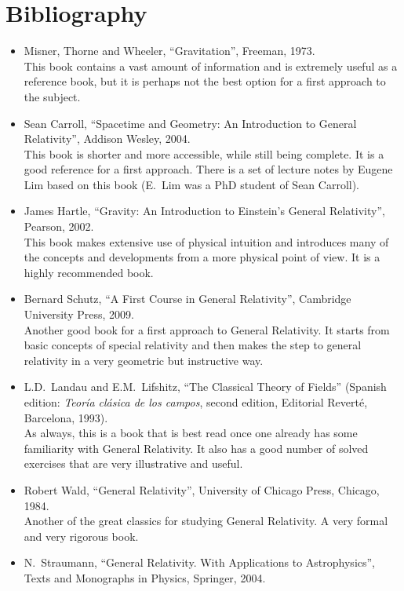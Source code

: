 \section*{Bibliography}
\begin{itemize}[label={},leftmargin=0pt,itemsep=0.6em]
\item Misner, Thorne and Wheeler, ``Gravitation'', Freeman, 1973.\\
This book contains a vast amount of information and is extremely useful as a reference book, but it is perhaps not the best option for a first approach to the subject.
\item Sean Carroll, ``Spacetime and Geometry: An Introduction to General Relativity'', Addison Wesley, 2004.\\
This book is shorter and more accessible, while still being complete. It is a good reference for a first approach. There is a set of lecture notes by Eugene Lim based on this book (E.~Lim was a PhD student of Sean Carroll).
\item James Hartle, ``Gravity: An Introduction to Einstein's General Relativity'', Pearson, 2002.\\
This book makes extensive use of physical intuition and introduces many of the concepts and developments from a more physical point of view. It is a highly recommended book.
\item Bernard Schutz, ``A First Course in General Relativity'', Cambridge University Press, 2009.\\
Another good book for a first approach to General Relativity. It starts from basic concepts of special relativity and then makes the step to general relativity in a very geometric but instructive way.
\item L.D.~Landau and E.M.~Lifshitz, ``The Classical Theory of Fields'' (Spanish edition: \emph{Teoría clásica de los campos}, second edition, Editorial Reverté, Barcelona, 1993).\\
As always, this is a book that is best read once one already has some familiarity with General Relativity. It also has a good number of solved exercises that are very illustrative and useful.
\item Robert Wald, ``General Relativity'', University of Chicago Press, Chicago, 1984.\\
Another of the great classics for studying General Relativity. A very formal and very rigorous book.
\item N.~Straumann, ``General Relativity. With Applications to Astrophysics'', Texts and Monographs in Physics, Springer, 2004.\\

\end{itemize}
